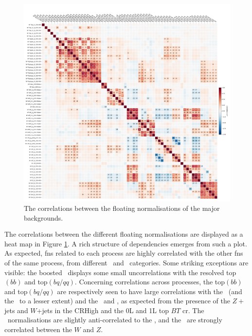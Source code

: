 \begin{figure}[h!]
    \hspace{-1.5cm}
    \includegraphics[width=1.15\textwidth]{Images/VH/Fit/fromSlides/SMVHbbcc_2022_MVA_mc16ade_v14.fit_012_fullRes_VHbb_fit_012_012_mc16ade_Systs_mva_VHbbcc_AsimovFit_conditional_mu1_Cov_BTag}
    \caption{The correlations between the floating normalisations of the major backgrounds.}
    \label{fig:FNcorr}
\end{figure} 
\newpage

The correlations between the different floating normalisations are displayed as a heat map in Figure \ref{fig:FNcorr}. A rich structure of dependencies emerges from such a plot. As expected, \glspl{fn} related to each process are highly correlated with the other \glspl{fn} of the same process, from different \ptv\ and \nj\ categories. Some striking exceptions are visible: the boosted \ttb\ displays some small uncorrelations with the resolved top$(bb)$ and top$(bq/qq)$. Concerning correlations across processes, the top$(bb)$ and top$(bq/qq)$ are respectively seen to have large correlations with the \zhf\ (and the \whf\ to a lesser extent) and the \wmf\ and \zmf, as expected from the presence of the $Z+$jets and $W$+jets in the CRHigh and the 0L and 1L top $BT$ \gls{cr}. The \vhf\ normalisations are slightly anti-correlated to the \vlf, and the \vlf\ are strongly correlated between the $W$ and $Z$.

